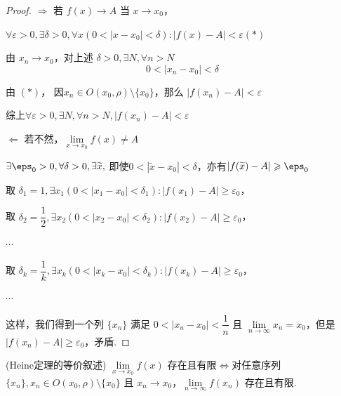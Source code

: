 \begin{proof}
	$\Rightarrow$ 若 $f(x) \to A$ 当 $x \to x_0$，
	
	$\forall \varepsilon > 0, \exists \delta > 0, \forall x (0 < |x - x_0| < \delta): |f(x) - A| < \varepsilon(*)$
	
	由 $x_n \to x_0$，对上述 $\delta > 0, \exists N, \forall n > N$ 
	\[
	0 < |x_n - x_0| < \delta
	\]
	
	由 $(*)$， 因$ x_n \in O(x_0, \rho) \setminus \{x_0\}$，那么 $ |f(x_n) - A| < \varepsilon$
	
	综上$\forall \varepsilon > 0, \exists N, \forall n > N, |f(x_n) - A| < \varepsilon$
	
	$\Leftarrow$ 若不然，$\lim\limits_{x\to x_0}f(x)\neq A$
	
	$\exists \eps_0>0,\forall \delta>0,\exists \widetilde{x},~$即使$0<|\widetilde{x}-x_0|<\delta$，亦有$|f(\widetilde{x})-A|\geqslant\eps_0$
	
	取 $\delta_1 = 1, \exists x_1 (0 < |x_1 - x_0| < \delta_1): |f(x_1) - A| \geqslant \varepsilon_0$，
	
	取 $\delta_2 = \dfrac{1}{2}, \exists x_2 (0 < |x_2 - x_0| < \delta_2): |f(x_2) - A| \geqslant \varepsilon_0$，
	
	$\cdots$
	
	取 $\delta_k = \dfrac{1}{k}, \exists x_k (0 < |x_k - x_0| < \delta_k): |f(x_k) - A| \geqslant \varepsilon_0$，
	
	$\cdots$
	
	这样，我们得到一个列 $\{x_n\}$ 满足 $0 < |x_n - x_0| < \dfrac{1}{n}$ 且 $\lim\limits_{n \to \infty} x_n = x_0$，但是 $|f(x_n) - A| \geqslant \varepsilon_0$，矛盾.
\end{proof}
\begin{corollary}
	(Heine定理的等价叙述)
	$\lim\limits_{x \to x_0} f(x)$ 存在且有限$\Leftrightarrow$对任意序列 $\{x_n\}, x_n \in O(x_0, \rho) \setminus \{x_0\}$ 且 $x_n \to x_0$，$\lim\limits_{n \to \infty} f(x_n)$ 存在且有限.
	
\end{corollary}

